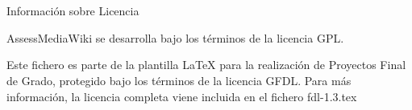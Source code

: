 


\chapter*{}

 \begin{center}

       Información sobre Licencia


\end{center}

AssessMediaWiki se desarrolla bajo los términos de la licencia GPL.

Este fichero es parte de la plantilla LaTeX para la realización de Proyectos Final de Grado, protegido bajo los términos de la licencia GFDL. Para más información, la licencia completa viene incluida en el fichero fdl-1.3.tex